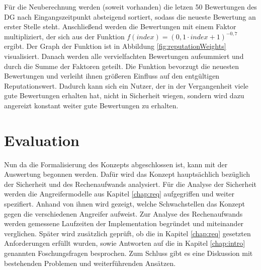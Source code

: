 \documentclass[
	fontsize=11pt,
	headings=small,
	parskip=half,           %
	bibliography=totoc,
	numbers=noenddot,       %
	open=any,               %
]{scrreprt}
\begin{document}
Für die Neuberechnung werden (soweit vorhanden) die letzen 50 Bewertungen des DG nach Eingangszeitpunkt absteigend sortiert, sodass die neueste Bewertung an erster Stelle steht. Anschließend werden die Bewertungen mit einem Faktor multipliziert, der sich aus der Funktion $f(index)=(0,1\cdot index + 1)^{-0,7}$ ergibt. Der Graph der Funktion ist in Abbildung \ref{fig:reputationWeights} visualisiert. Danach werden alle vervielfachten Bewertungen aufsummiert und durch die Summe der Faktoren geteilt. Die Funktion bevorzugt die neuesten Bewertungen und verleiht ihnen größeren Einfluss auf den entgültigen Reputationswert. Dadurch kann sich ein Nutzer, der in der Vergangenheit viele gute Bewertungen erhalten hat, nicht in Sicherheit wiegen, sondern wird dazu angereizt konstant weiter gute Bewertungen zu erhalten.




\chapter{Evaluation}
\label{chap:auswertung}
Nun da die Formalisierung des Konzepts abgeschlossen ist, kann mit der Auswertung begonnen werden. Dafür wird das Konzept hauptsächlich bezüglich der Sicherheit und des Rechenaufwands analysiert. Für die Analyse der Sicherheit werden die Angreifermodelle aus Kapitel \ref{chap:req} aufgegriffen und weiter spezifiert. Anhand von ihnen wird gezeigt, welche Schwachstellen das Konzept gegen die verschiedenen Angreifer aufweist. Zur Analyse des Rechenaufwands werden gemessene Laufzeiten der Implementation begründet und miteinander verglichen. Später wird zusätzlich geprüft, ob die in Kapitel \ref{chap:req} gesetzten Anforderungen erfüllt wurden, sowie Antworten auf die in Kapitel \ref{chap:intro} genannten Foschungsfragen besprochen. Zum Schluss gibt es eine Diskussion mit bestehenden Problemen und weiterführenden Ansätzen.
\end{document}
